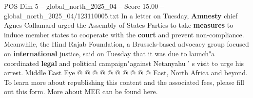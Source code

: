 \begin{textsample}{POS Dim 5 – global\_north\_2025\_04 – Score 15.00 – global\_north\_2025\_04/123110005.txt}
In a letter on Tuesday, \textbf{Amnesty} chief Agnes Callamard urged the Assembly of States Parties to take \textbf{measures} to induce member states to cooperate with the \textbf{court} and prevent non-compliance.
Meanwhile, the Hind Rajab Foundation, a Brussels-based advocacy group focused on \textbf{international} justice, said on Tuesday that it was due to launch"a coordinated \textbf{legal} and political campaign"against Netanyahu ' s visit to urge his arrest.
Middle East Eye @ @ @ @ @ @ @ @ @ @ East, North Africa and beyond.
To learn more about republishing this content and the associated fees, please fill out this form.
More about MEE can be found here.

\end{textsample}
